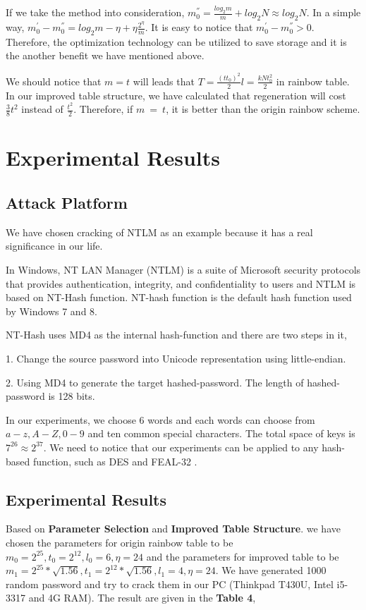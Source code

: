\documentclass[runningheads,a4paper]{llncs}
\begin{document}
If we take the method into consideration, $m_0^{''} = \frac{log_2 m}{m} + log_2 N \approx log_2 N$. In a simple way, $m_0^{'} - m_0^{''} = log_2 m - \eta + \eta \frac{2^\eta}{m}$. It is easy to notice that $m_0^{'} - m_0^{''} > 0$. Therefore, the optimization technology can be utilized to save storage and it is the another benefit we have mentioned above.

We should notice that $m = t$ will leads that $T = \frac{(tt_0)^2}{2}l = \frac{kN t_0^2}{2}$ in rainbow table. In our improved table structure, we have calculated that regeneration will cost $\frac{3}{8} t^2$ instead of $\frac{t^2}{2}$. Therefore, if $m~=~t$, it is better than the origin rainbow scheme.

\section{Experimental Results}
\subsection{Attack Platform}
We have chosen cracking of NTLM as an example because it has a real significance in our life.

In Windows, NT LAN Manager (NTLM) \cite{malhotra2013review} is a suite of Microsoft security protocols that provides authentication, integrity, and confidentiality to users and NTLM is based on NT-Hash function. NT-hash function is the default hash function used by Windows 7 and 8.

NT-Hash uses MD4 as the internal hash-function and there are two steps in it,

1. Change the source password into Unicode representation using little-endian.

2. Using MD4 to generate the target hashed-password. The length of hashed-password is 128 bits.

In our experiments, we choose 6 words and each words can choose from $a - z, A - Z, 0 - 9$ and ten common special characters. The total space of keys is $7^{26} \approx 2^{37}$. We need to notice that our experiments can be applied to any hash-based function, such as DES and FEAL-32 \cite{kusuda1996optimization}.

\subsection{Experimental Results}
Based on \textbf{Parameter Selection} and \textbf{Improved Table Structure}. we have chosen the parameters for origin rainbow table to be $m_0 = 2^{25}, t_0 = 2^{12}, l_0 = 6, \eta = 24$ and the parameters for improved table to be $m_1 = 2^{25}*\sqrt{1.56}, t_1 = 2^{12}*\sqrt{1.56}, l_1 = 4, \eta = 24$. We have generated 1000 random password and try to crack them in our PC (Thinkpad T430U, Intel i5-3317 and 4G RAM). The result are given in the \textbf{Table 4},
\end{document}
